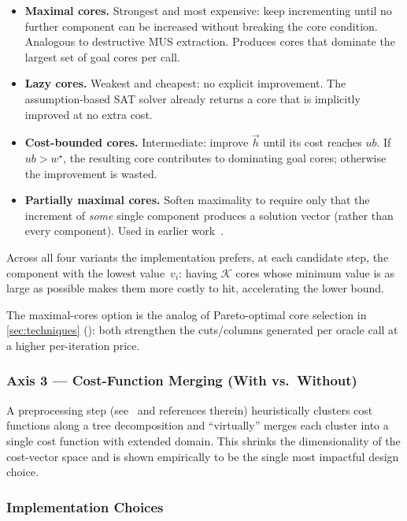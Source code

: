 \begin{itemize}
\item \textbf{Maximal cores.} Strongest and most expensive: keep incrementing
until no further component can be increased without breaking the core
condition. Analogous to destructive MUS extraction. Produces cores that
dominate the largest set of goal cores per call.

\item \textbf{Lazy cores.} Weakest and cheapest: no explicit improvement. The
assumption-based SAT solver already returns a core that is implicitly
improved at no extra cost.

\item \textbf{Cost-bounded cores.} Intermediate: improve $\vec{h}$ until its
cost reaches $\mathit{ub}$. If $\mathit{ub} > w^\star$, the resulting core
contributes to dominating goal cores; otherwise the improvement is wasted.

\item \textbf{Partially maximal cores.} Soften maximality to require only that
the increment of \emph{some} single component produces a solution vector
(rather than every component). Used in earlier work~\citep{moreno2013implicit}.
\end{itemize}

Across all four variants the implementation prefers, at each candidate step,
the component with the lowest value~$v_i$: having $\mathcal{K}$ cores whose
minimum value is as large as possible makes them more costly to hit,
accelerating the lower bound.

The maximal-cores option is the analog of Pareto-optimal core selection in
\cref{sec:techniques} (\citet{magnanti1981accelerating}): both
strengthen the cuts/columns generated per oracle call at a higher
per-iteration price.

\subsubsection{Axis 3 --- Cost-Function Merging (With vs.\ Without)}

A preprocessing step (see~\citet{petrova2025empirical} and references therein)
heuristically clusters cost functions along a tree decomposition and
``virtually'' merges each cluster into a single cost function with extended
domain. This shrinks the dimensionality of the cost-vector space and is shown
empirically to be the single most impactful design choice.

\subsubsection{Implementation Choices}

